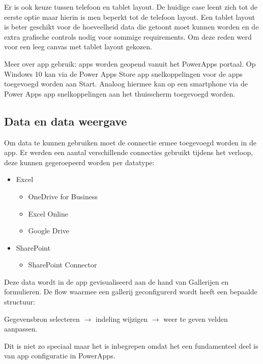 Er is ook keuze tussen telefoon en tablet layout. De huidige case leent zich tot de eerste optie maar hierin is men beperkt tot de telefoon layout. Een tablet layout is beter geschikt voor de hoeveelheid data die getoont moet kunnen worden en de extra grafische controls nodig voor sommige requirements. Om deze reden werd voor een leeg canvas met tablet layout gekozen.

Meer over app gebruik: apps worden geopend vanuit het PowerApps portaal. Op Windows 10 kan via de Power Apps Store app snelkoppelingen voor de apps toegevoegd worden aan Start. Analoog hiermee kan op een smartphone via de Power Apps app snelkoppelingen aan het thuisscherm toegevoegd worden.

\subsection{Data en data weergave}


Om data te kunnen gebruiken moet de connectie ermee toegevoegd worden in de app. Er werden een aantal verschillende connecties gebruikt tijdens het verloop, deze kunnen gegeroepeerd worden per datatype:
\begin{itemize}
    \item Excel
        \begin{itemize}
            \item OneDrive for Business
            \item Excel Online
            \item Google Drive
        \end{itemize}
    \item SharePoint
    \begin{itemize}
        \item SharePoint Connector
    \end{itemize}
\end{itemize}

Deze data wordt in de app gevisualiseerd  aan de hand van Gallerijen en formulieren. De flow waarmee een gallerij geconfigurerd wordt heeft een bepaalde structuur: 

\hspace{1cm}Gegevensbron selecteren $\rightarrow$ indeling wijzigen $\rightarrow$ weer te geven velden aanpassen. 

Dit is niet zo speciaal maar het is inbegrepen omdat het een fundamenteel deel is van app configuratie in PowerApps.

